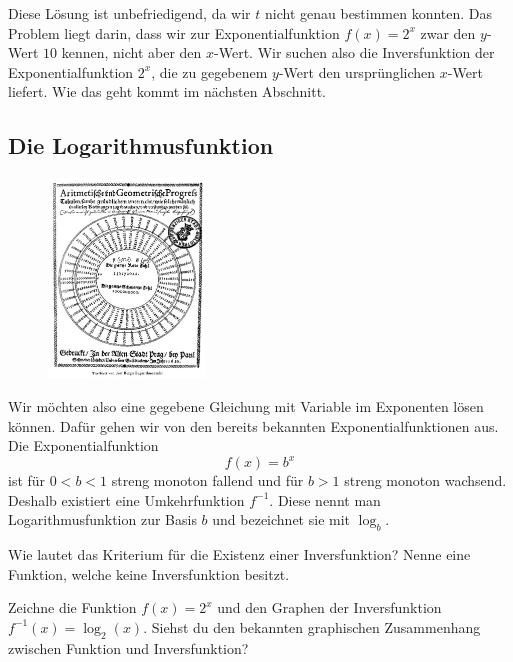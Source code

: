 \documentclass[%
11pt,%
twoside,%
titlepage,%
german,%
headsepline%
]{scrartcl}
\begin{document}
  Diese Lösung ist unbefriedigend, da wir $t$ nicht genau bestimmen
  konnten. Das Problem liegt darin, dass wir zur Exponentialfunktion $f(x)=2^x$ zwar den $y$-Wert $10$ kennen, nicht aber den $x$-Wert. Wir suchen also die Inversfunktion der Exponentialfunktion $2^x$, die zu gegebenem $y$-Wert den ursprünglichen $x$-Wert liefert. Wie das geht kommt im nächsten Abschnitt.
  
\subsection{Die Logarithmusfunktion}
  \begin{figure}
  \begin{center}
    \includegraphics[width=0.37\textwidth]{pictures/logarithmentafel}
  \end{center}
\end{figure}
Wir möchten also eine gegebene Gleichung mit Variable im Exponenten lösen können. Dafür gehen wir von den bereits bekannten Exponentialfunktionen aus. Die Exponentialfunktion
$$f(x)=b^x$$
ist für $0<b<1$ streng monoton fallend und für $b>1$ streng monoton wachsend. Deshalb existiert eine Umkehrfunktion $f^{-1}$. Diese nennt man Logarithmusfunktion zur Basis $b$ und bezeichnet sie mit $\log_b$.

\begin{ueb}
Wie lautet das Kriterium für die Existenz einer Inversfunktion? Nenne eine Funktion, welche keine Inversfunktion besitzt.
\end{ueb} 

\begin{ueb}
Zeichne die Funktion $f(x)=2^x$ und den Graphen der Inversfunktion $f^{-1}(x)=\log_2(x)$. Siehst du den bekannten graphischen Zusammenhang zwischen Funktion und Inversfunktion?
\end{ueb}
\end{document}
